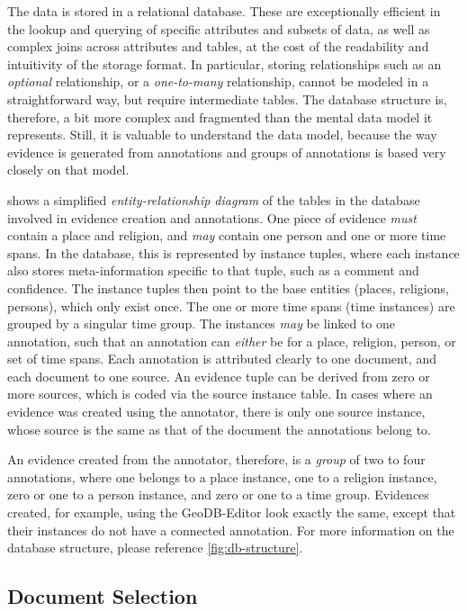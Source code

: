 The data is stored in a relational database.
These are exceptionally efficient in the lookup and querying of specific attributes and subsets of data, as well as complex joins across attributes and tables, at the cost of the readability and intuitivity of the storage format.
In particular, storing relationships such as an \emph{optional} relationship, or a \emph{one-to-many} relationship, cannot be modeled in a straightforward way, but require intermediate tables.
The database structure is, therefore, a bit more complex and fragmented than the mental data model it represents.
Still, it is valuable to understand the data model, because the way evidence is generated from annotations and groups of annotations is based very closely on that model.

 shows a simplified \emph{entity-relationship diagram} of the tables in the database involved in evidence creation and annotations.
One piece of evidence \emph{must} contain a place and religion, and \emph{may} contain one person and one or more time spans.
In the database, this is represented by instance tuples, where each instance also stores meta-information specific to that tuple, such as a comment and confidence.
The instance tuples then point to the base entities (places, religions, persons), which only exist once.
The one or more time spans (time instances) are grouped by a singular time group.
The instances \emph{may} be linked to one annotation, such that an annotation can \emph{either} be for a place, religion, person, or set of time spans.
Each annotation is attributed clearly to one document, and each document to one source.
An evidence tuple can be derived from zero or more sources, which is coded via the source instance table.
In cases where an evidence was created using the annotator, there is only one source instance, whose source is the same as that of the document the annotations belong to.

An evidence created from the annotator, therefore, is a \emph{group} of two to four annotations, where one belongs to a place instance, one to a religion instance, zero or one to a person instance, and zero or one to a time group.
Evidences created, for example, using the GeoDB-Editor look exactly the same, except that their instances do not have a connected annotation.
For more information on the database structure, please reference \cref{fig:db-structure}.


\subsection{Document Selection}
\label{sec:document-selection}

